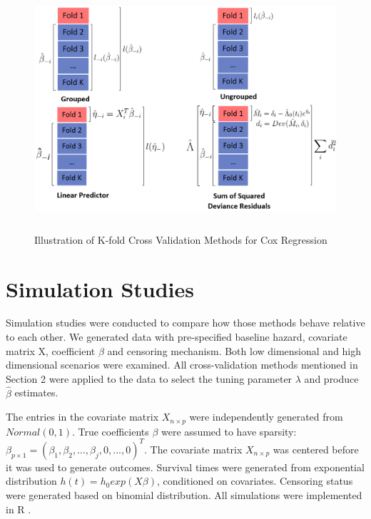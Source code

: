\begin{figure}
    \centering
		\includegraphics[height= 9cm ]{./figures/figure_1.png}
    \caption{Illustration of K-fold Cross Validation Methods for Cox Regression}
\end{figure}	


\section{Simulation Studies}

  Simulation studies were conducted to compare how those methods behave relative to each other. We generated data with pre-specified baseline hazard, covariate matrix X, coefficient $\beta$ and censoring mechanism. Both low dimensional and high dimensional scenarios were examined. All cross-validation methods mentioned in Section 2 were applied to the data to select the tuning parameter $\lambda$ and produce $\hat{\beta}$ estimates. %
  
 The entries in the covariate matrix $X_{n \times p}$ were independently generated from $Normal(0, 1)$. True coefficients $\beta$ were assumed to have sparsity: $\beta_{p\times 1} = (\beta_{1},\beta_{2}, ..., \beta_{j}, 0, ..., 0)^{T}$. The covariate matrix $X_{n \times p}$ was centered before it was used to generate outcomes. Survival times were generated from exponential distribution $h(t) = h_{0} exp(X\beta)$, conditioned on covariates. Censoring status were generated based on binomial distribution. All simulations were implemented in R \citep{R}.
  
